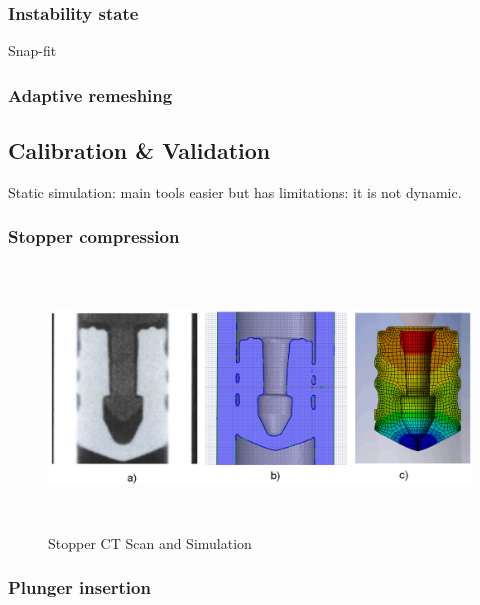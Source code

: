 \subsubsection{Instability state}
Snap-fit

\subsubsection{Adaptive remeshing}

\newpage
\subsection{Calibration \& Validation}
Static simulation: main tools easier but has limitations: it is not dynamic.

\subsubsection{Stopper compression}
\begin{figure}[h!]	
	\centering
\includegraphics[height=7cm]{img/valicross.PNG}
   \caption{Stopper CT Scan and Simulation}
 \label{fgr:PFS}
\end{figure}

\newpage
\subsubsection{Plunger insertion}

